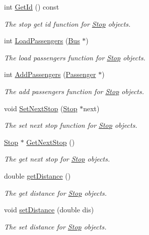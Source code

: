\begin{figure}[H]
\begin{center}
\begin{DoxyCompactItemize}
int \hyperlink{classStop_a2f3b845d5a338f197226c90696314904}{Get\+Id} () const
\begin{DoxyCompactList}\small\item\em The stop get id function for \hyperlink{classStop}{Stop} objects. \end{DoxyCompactList}\item 
int \hyperlink{classStop_a02c6dcba2b6de5fdd008cf623f19bf7c}{Load\+Passengers} (\hyperlink{classBus}{Bus} $\ast$)
\begin{DoxyCompactList}\small\item\em The load passengers function for \hyperlink{classStop}{Stop} objects. \end{DoxyCompactList}\item 
int \hyperlink{classStop_a20a8b6035679d92a7a838a03a102bcd1}{Add\+Passengers} (\hyperlink{classPassenger}{Passenger} $\ast$)
\begin{DoxyCompactList}\small\item\em The add passengers function for \hyperlink{classStop}{Stop} objects. \end{DoxyCompactList}\item 
void \hyperlink{classStop_a7e39a7138f5bcf8f144155de7b1ae1aa}{Set\+Next\+Stop} (\hyperlink{classStop}{Stop} $\ast$next)
\begin{DoxyCompactList}\small\item\em The set next stop function for \hyperlink{classStop}{Stop} objects. \end{DoxyCompactList}\item 
\hyperlink{classStop}{Stop} $\ast$ \hyperlink{classStop_a195566d0fb9cc1bcc8929cffd5602052}{Get\+Next\+Stop} ()
\begin{DoxyCompactList}\small\item\em The get next stop for \hyperlink{classStop}{Stop} objects. \end{DoxyCompactList}\item 
double \hyperlink{classStop_a75185ff04f33083582c98230fc3a6df4}{get\+Distance} ()
\begin{DoxyCompactList}\small\item\em The get distance for \hyperlink{classStop}{Stop} objects. \end{DoxyCompactList}\item 
void \hyperlink{classStop_af26acbcbca66d3a36ce01bc662e2e892}{set\+Distance} (double dis)
\begin{DoxyCompactList}\small\item\em The set distance for \hyperlink{classStop}{Stop} objects. \end{DoxyCompactList}\item 

\end{DoxyCompactItemize}
\end{center}
\end{figure}
